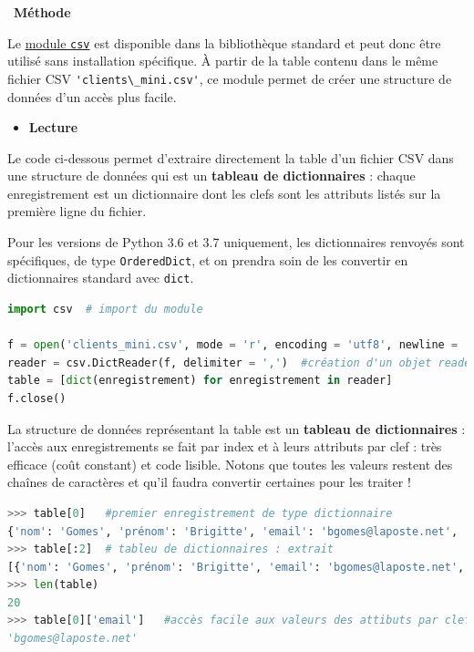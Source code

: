 \documentclass[
  11pt,
]{article}
\newcommand{\passthrough}[1]{#1}
\providecommand{\tightlist}{%
  \setlength{\itemsep}{0pt}\setlength{\parskip}{0pt}}
\newenvironment{methode}[1]
{\par \medskip    \noindent  
 \begin {bclogo}[arrondi =0.1,logo=\bcoutil, marge=4,noborder = true] {~\textbf{Méthode}   {\itshape #1} }  \par}
{
\end{bclogo}
 \par \bigskip }
\begin{document}
\begin{methode}{}

Le \href{https://docs.python.org/fr/3/library/csv.html}{module
\passthrough{\lstinline!csv!}} est disponible dans la bibliothèque
standard et peut donc être utilisé sans installation spécifique. À
partir de la table contenu dans le même fichier CSV
\passthrough{\lstinline!'clients\_mini.csv'!}, ce module permet de créer
une structure de données d'un accès plus facile.

\begin{itemize}
\tightlist
\item
  \textbf{Lecture}
\end{itemize}

Le code ci-dessous permet d'extraire directement la table d'un fichier
CSV dans une structure de données qui est un \textbf{tableau de
dictionnaires} : chaque enregistrement est un dictionnaire dont les
clefs sont les attributs listés sur la première ligne du fichier.

Pour les versions de Python 3.6 et 3.7 uniquement, les dictionnaires
renvoyés sont spécifiques, de type
\passthrough{\lstinline!OrderedDict!}, et on prendra soin de les
convertir en dictionnaires standard avec \passthrough{\lstinline!dict!}.

\begin{lstlisting}[language=Python]
import csv  # import du module 

f = open('clients_mini.csv', mode = 'r', encoding = 'utf8', newline = '')
reader = csv.DictReader(f, delimiter = ',')  #création d'un objet reader
table = [dict(enregistrement) for enregistrement in reader]
f.close()
\end{lstlisting}

La structure de données représentant la table est un \textbf{tableau de
dictionnaires} : l'accès aux enregistrements se fait par index et à
leurs attributs par clef : très efficace (coût constant) et code
lisible. Notons que toutes les valeurs restent des chaînes de caractères
et qu'il faudra convertir certaines pour les traiter !

\begin{lstlisting}[language=Python]
>>> table[0]   #premier enregistrement de type dictionnaire
{'nom': 'Gomes', 'prénom': 'Brigitte', 'email': 'bgomes@laposte.net', 'département': '79', 'naissance': '1960-08-21', 'visites': '67', 'dépenses': '8342.99'}
>>> table[:2]  # tableu de dictionnaires : extrait
[{'nom': 'Gomes', 'prénom': 'Brigitte', 'email': 'bgomes@laposte.net', 'département': '79', 'naissance': '1960-08-21', 'visites': '67', 'dépenses': '8342.99'}, {'nom': 'Nicolas', 'prénom': 'Georges', 'email': 'gnicolas@yahoo.fr', 'département': '10', 'naissance': '1994-05-26', 'visites': '86', 'dépenses': '10908.08'}]
>>> len(table)
20
>>> table[0]['email']   #accès facile aux valeurs des attibuts par clefs
'bgomes@laposte.net'
\end{lstlisting}


\end{methode}
\end{document}
